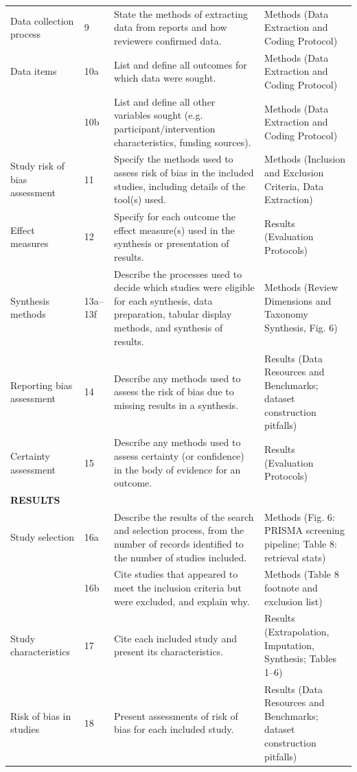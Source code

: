 \documentclass[10pt,a4paper]{article}
\begin{document}
\begin{longtable}{p{2.2cm} p{1.2cm} p{8.5cm} p{4.0cm}}
Data collection process & 9 & State the methods of extracting data from reports and how reviewers confirmed data. & Methods (Data Extraction and Coding Protocol) \\
Data items & 10a & List and define all outcomes for which data were sought. & Methods (Data Extraction and Coding Protocol) \\
& 10b & List and define all other variables sought (e.g. participant/intervention characteristics, funding sources). & Methods (Data Extraction and Coding Protocol) \\
Study risk of bias assessment & 11 & Specify the methods used to assess risk of bias in the included studies, including details of the tool(s) used. & Methods (Inclusion and Exclusion Criteria, Data Extraction) \\
Effect measures & 12 & Specify for each outcome the effect measure(s) used in the synthesis or presentation of results. & Results (Evaluation Protocols) \\
Synthesis methods & 13a--13f & Describe the processes used to decide which studies were eligible for each synthesis, data preparation, tabular display methods, and synthesis of results. & Methods (Review Dimensions and Taxonomy Synthesis, Fig. 6) \\
Reporting bias assessment & 14 & Describe any methods used to assess the risk of bias due to missing results in a synthesis. & Results (Data Resources and Benchmarks; dataset construction pitfalls) \\
Certainty assessment & 15 & Describe any methods used to assess certainty (or confidence) in the body of evidence for an outcome. & Results (Evaluation Protocols) \\
\midrule
\textbf{RESULTS} & & & \\
Study selection & 16a & Describe the results of the search and selection process, from the number of records identified to the number of studies included. & Methods (Fig. 6: PRISMA screening pipeline; Table 8: retrieval stats) \\
& 16b & Cite studies that appeared to meet the inclusion criteria but were excluded, and explain why. & Methods (Table 8 footnote and exclusion list) \\
Study characteristics & 17 & Cite each included study and present its characteristics. & Results (Extrapolation, Imputation, Synthesis; Tables 1--6) \\
Risk of bias in studies & 18 & Present assessments of risk of bias for each included study. & Results (Data Resources and Benchmarks; dataset construction pitfalls) \\

\end{longtable}
\end{document}
